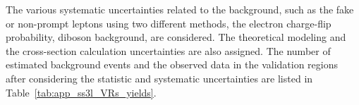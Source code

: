 The various systematic uncertainties related to the background, such as the fake or non-prompt leptons using two different methods, the electron charge-flip probability, diboson background, are considered.
The theoretical modeling and the cross-section calculation uncertainties are also assigned.
The number of estimated background events and the observed data in the validation regions after considering the statistic and systematic uncertainties are listed in Table~\ref{tab:app_ss3l_VRs_yields}.

\begin{table}[htbp]
\end{table}
